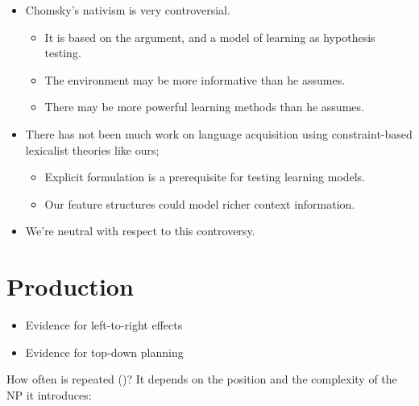 \documentclass[a4paper,landscape,headrule,footrule]{foils}
\begin{document}

\begin{itemize}
\item Chomsky’s nativism is very controversial.
  \begin{itemize}
  \item It is based on the  argument, and a 
    model of learning as hypothesis testing.  
  \item The environment may be more informative than he assumes.
  \item There may be more powerful learning methods than he 
    assumes.
  \end{itemize}
\item There has not been much work on language acquisition 
  using constraint-based lexicalist theories like ours;  
  \begin{itemize}
  \item Explicit formulation is a prerequisite for testing learning models.
  \item Our feature structures could model richer context information.
  \end{itemize}
\item We’re neutral with respect to this controversy.
\end{itemize}

\section{Production}



\begin{itemize}
\item Evidence for left-to-right effects
\item Evidence for top-down planning
\end{itemize}


How often is  repeated ()?  It depends
on the position and the complexity of the NP it introduces:
\vspace{-1ex}
\end{document}
